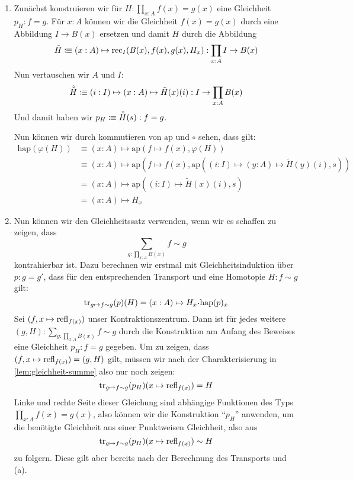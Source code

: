 \begin{beweis}
  \begin{enumerate}
  \item   Zunächst konstruieren wir für $H:\prod_{x:A}f(x)=g(x)$ eine Gleichheit $p_H:f=g$.
  Für $x:A$ können wir die Gleichheit $f(x)=g(x)$ durch eine Abbildung $I\to B(x)$ ersetzen
  und damit $H$ durch die Abbildung
  \[
    \tilde{H}\vcentcolon\mspace{-1.2mu}\equiv (x:A)\mapsto \mathrm{rec}_{I}(B(x),f(x),g(x),H_x) : \prod_{x:A}I\to B(x)
  \]
  Nun vertauschen wir $A$ und $I$:
  \[
    \tilde{\tilde{H}}\vcentcolon\mspace{-1.2mu}\equiv (i:I)\mapsto (x:A)\mapsto \tilde{H}(x)(i) : I\to\prod_{x:A}B(x)
  \]
  Und damit haben wir $p_H\vcentcolon\mspace{-1.2mu}\equiv \tilde{\tilde{H}}(s) : f=g$.

  Nun können wir durch kommutieren von $\mathrm{ap}$ und $\circ$ sehen, dass gilt:
  \begin{align*}
    \mathrm{hap}(\varphi(H))&\equiv (x:A)\mapsto\mathrm{ap}(f\mapsto f(x),\varphi(H)) \\
                            &\equiv (x:A)\mapsto\mathrm{ap}(f\mapsto f(x),\mathrm{ap}((i:I)\mapsto (y:A)\mapsto \tilde{H}(y)(i),s)) \\
                            &= (x:A)\mapsto \mathrm{ap}((i:I)\mapsto \tilde{H}(x)(i),s) \\
                            &= (x:A)\mapsto H_x
  \end{align*}
\item Nun können wir den Gleichheitssatz verwenden, wenn wir es schaffen zu zeigen, dass
  \[
    \sum_{g:\prod_{x:A}B(x)}f\sim g
  \]
  kontrahierbar ist. Dazu berechnen wir erstmal mit Gleichheitsinduktion über $p:g=g'$,
  dass für den entsprechenden Transport und eine Homotopie $H:f\sim g$ gilt:
  \[
    \transp_{g\mapsto f\sim g}(p)(H)=(x:A)\mapsto H_x\kon \mathrm{hap}(p)_x
  \]
  Sei $(f,x\mapsto \mathrm{refl}_{f(x)})$ unser Kontraktionszentrum.
  Dann ist für jedes weitere $(g,H):\sum_{g:\prod_{x:A}B(x)}f\sim g$ durch die Konstruktion am Anfang des Beweises eine Gleichheit $p_H:f=g$ gegeben.
  Um zu zeigen, dass $(f,x\mapsto \mathrm{refl}_{f(x)})=(g,H)$ gilt, müssen wir nach der Charakterisierung in \cref{lem:gleichheit-summe} also nur noch zeigen:
  \[
    \mathrm{tr}_{g\mapsto f\sim g}(p_H)(x\mapsto\mathrm{refl}_{f(x)})=H
  \]
  Linke und rechte Seite dieser Gleichung sind abhängige Funktionen des Typs $\prod_{x:A}f(x)=g(x)$,
  also können wir die Konstruktion ``$p_H$'' anwenden, um die benötigte Gleichheit aus einer Punktweisen Gleichheit, also aus 
  \[
    \mathrm{tr}_{g\mapsto f\sim g}(p_H)(x\mapsto\mathrm{refl}_{f(x)})\sim H
  \]
  zu folgern. Diese gilt aber bereits nach der Berechnung des Transports und (a).
\end{enumerate}
\end{beweis}

